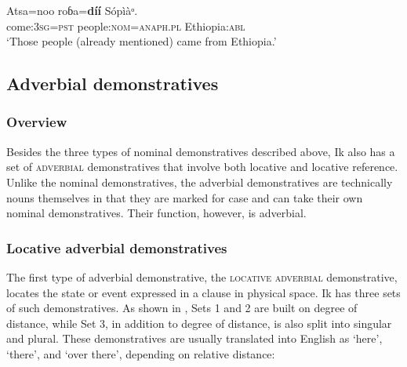 \ea\label{ex:dem:6}
\gll Atsa=noo     roɓa=\textbf{díí}            Sópìàᵒ. \\
come:\textsc{3sg}=\textsc{pst}   people:\textsc{nom}=\textsc{anaph.pl}  Ethiopia:\textsc{abl}    \\
\glt ‘Those people (already mentioned) came from Ethiopia.’ 
\z






\subsection{Adverbial demonstratives}\label{sec:6.5}
\subsubsection{Overview}\label{sec:6.5.1}

Besides the three types of nominal demonstratives described above, Ik also has a set of \textsc{adverbial} demonstratives that involve both locative and  locative reference. Unlike the nominal demonstratives, the adverbial demonstratives are technically nouns themselves in that they are marked for case and can take their own nominal demonstratives. Their function, however, is adverbial.


\subsubsection{Locative adverbial demonstratives}\label{sec:6.5.2}

The first type of adverbial demonstrative, the \textsc{locative adverbial} demonstrative, locates the state or event expressed in a clause in physical space. Ik has three sets of such demonstratives. As shown in , Sets 1 and 2 are built on degree of distance, while Set 3, in addition to degree of distance, is also split into singular and plural. These demonstratives are usually translated into English as ‘here’, ‘there’, and ‘over there’, depending on relative distance:


